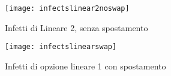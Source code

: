 \documentclass[a4paper]{article}
\begin{document}
\begin{figure}
	\centering
	\texttt{[image: infectslinear2noswap]}
	\caption[Infetti lineare 2 noSpostamento]{Infetti di Lineare 2, senza spostamento}
	
\end{figure}
\begin{figure}
	\centering
	\texttt{[image: infectslinearswap]}
	\caption[Infetti lineare 2 noSpostamento]{Infetti di opzione lineare 1 con spostamento}
	
\end{figure}
\end{document}
